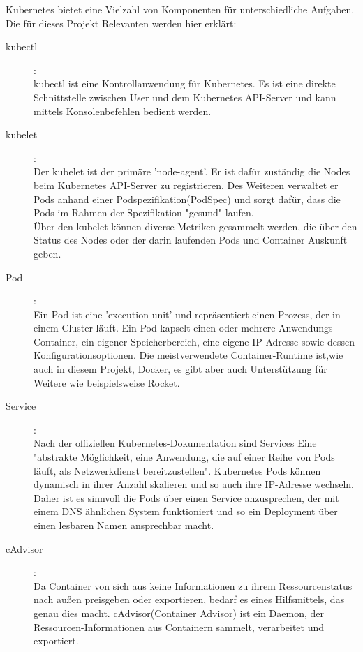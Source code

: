 \documentclass[a4paper,12pt]{scrartcl}
\begin{document}
Kubernetes bietet eine Vielzahl von Komponenten für unterschiedliche Aufgaben. Die für dieses Projekt Relevanten werden hier erklärt:

\begin{description}

\item [kubectl]:\\
kubectl ist eine Kontrollanwendung für Kubernetes. Es ist eine direkte Schnittstelle zwischen User und dem Kubernetes API-Server und kann mittels Konsolenbefehlen bedient werden.
\item [kubelet]: \\
Der kubelet ist der primäre 'node-agent'. Er ist dafür zuständig die Nodes beim Kubernetes API-Server zu registrieren. Des Weiteren verwaltet er Pods anhand einer Podspezifikation(PodSpec) und sorgt dafür, dass die Pods im Rahmen der Spezifikation "gesund" laufen.\\
Über den kubelet können diverse Metriken gesammelt werden, die über den Status des Nodes oder der darin laufenden Pods und Container Auskunft geben.
\item [Pod]:\\
Ein Pod ist eine 'execution unit' und repräsentiert einen Prozess, der in einem Cluster läuft. Ein Pod kapselt einen oder mehrere Anwendungs-Container, ein eigener Speicherbereich, eine eigene IP-Adresse sowie dessen Konfigurationsoptionen.
Die meistverwendete Container-Runtime ist,wie auch in diesem Projekt, Docker, es gibt aber auch Unterstützung für Weitere wie beispielsweise Rocket.
\item [Service]:\\
Nach der offiziellen Kubernetes-Dokumentation sind Services Eine "abstrakte Möglichkeit, eine Anwendung, die auf einer Reihe von Pods läuft, als Netzwerkdienst bereitzustellen".
Kubernetes Pods können dynamisch in ihrer Anzahl skalieren und so auch ihre IP-Adresse wechseln. Daher ist es sinnvoll die Pods über einen Service anzusprechen, der mit einem DNS ähnlichen System funktioniert und so ein Deployment über einen lesbaren Namen ansprechbar macht.  
\item [cAdvisor]:\\
Da Container von sich aus keine Informationen zu ihrem Ressourcenstatus nach außen preisgeben oder exportieren, bedarf es eines Hilfsmittels, das genau dies macht.
cAdvisor(Container Advisor) ist ein Daemon, der Ressourcen-Informationen aus Containern sammelt, verarbeitet und exportiert.\cite{.20200704T23:29:24.000Z}


\end{description}
\end{document}
